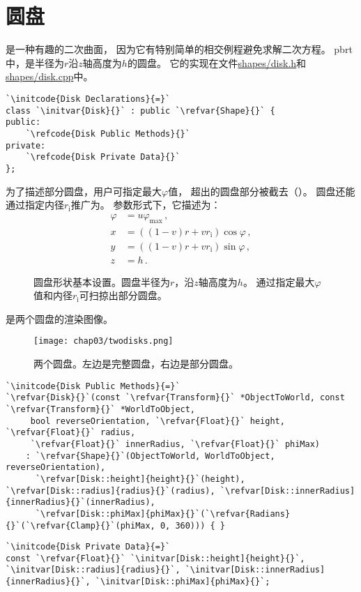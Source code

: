 \section{圆盘}\label{sec:圆盘}

是一种有趣的二次曲面，
因为它有特别简单的相交例程避免求解二次方程。
pbrt中，是半径为$r$沿$z$轴高度为$h$的圆盘。
它的实现在文件\href{https://github.com/mmp/pbrt-v3/tree/master/src/shapes/disk.h}{\ttfamily shapes/disk.h}和
\href{https://github.com/mmp/pbrt-v3/tree/master/src/shapes/disk.cpp}{\ttfamily shapes/disk.cpp}中。
\begin{lstlisting}
`\initcode{Disk Declarations}{=}`
class `\initvar{Disk}{}` : public `\refvar{Shape}{}` {
public:
    `\refcode{Disk Public Methods}{}`
private:
    `\refcode{Disk Private Data}{}`
};
\end{lstlisting}

为了描述部分圆盘，用户可指定最大$\varphi$值，
超出的圆盘部分被截去（）。
圆盘还能通过指定内径$r_{\mathrm{i}}$推广为。
参数形式下，它描述为：
\begin{align*}
    \varphi & =u\varphi_{\max}\, ,                     \\
    x       & =((1-v)r+vr_{\mathrm{i}})\cos\varphi\, , \\
    y       & =((1-v)r+vr_{\mathrm{i}})\sin\varphi\, , \\
    z       & =h\, .
\end{align*}
\begin{figure}[htbp]
    \centering
    \caption{圆盘形状基本设置。圆盘半径为$r$，沿$z$轴高度为$h$。
        通过指定最大$\varphi$值和内径$r_{\mathrm{i}}$可扫掠出部分圆盘。}
    \label{fig:3.8}
\end{figure}

是两个圆盘的渲染图像。
\begin{figure}[htbp]
    \centering\texttt{[image: chap03/twodisks.png]}
    \caption{两个圆盘。左边是完整圆盘，右边是部分圆盘。}
    \label{fig:3.9}
\end{figure}
\begin{lstlisting}
`\initcode{Disk Public Methods}{=}`
`\refvar{Disk}{}`(const `\refvar{Transform}{}` *ObjectToWorld, const `\refvar{Transform}{}` *WorldToObject,
     bool reverseOrientation, `\refvar{Float}{}` height, `\refvar{Float}{}` radius,
     `\refvar{Float}{}` innerRadius, `\refvar{Float}{}` phiMax)
    : `\refvar{Shape}{}`(ObjectToWorld, WorldToObject, reverseOrientation),
      `\refvar[Disk::height]{height}{}`(height), `\refvar[Disk::radius]{radius}{}`(radius), `\refvar[Disk::innerRadius]{innerRadius}{}`(innerRadius),
      `\refvar[Disk::phiMax]{phiMax}{}`(`\refvar{Radians}{}`(`\refvar{Clamp}{}`(phiMax, 0, 360))) { }
\end{lstlisting}
\begin{lstlisting}
`\initcode{Disk Private Data}{=}`
const `\refvar{Float}{}` `\initvar[Disk::height]{height}{}`, `\initvar[Disk::radius]{radius}{}`, `\initvar[Disk::innerRadius]{innerRadius}{}`, `\initvar[Disk::phiMax]{phiMax}{}`;
\end{lstlisting}